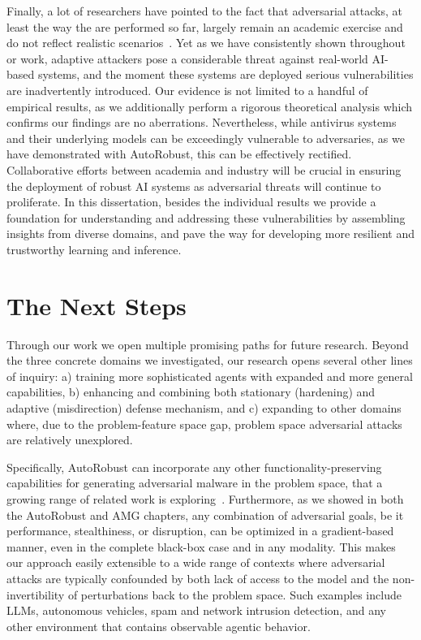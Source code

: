 Finally, a lot of researchers have pointed to the fact that adversarial attacks, at least the way the are performed so far, largely remain an academic exercise and do not reflect realistic scenarios~\cite{apruzzese2023real}.
Yet as we have consistently shown throughout or work, adaptive attackers pose a considerable threat against real-world AI-based systems, and the moment these systems are deployed serious vulnerabilities are inadvertently introduced.
Our evidence is not limited to a handful of empirical results, as we additionally perform a rigorous theoretical analysis which confirms our findings are no aberrations.
Nevertheless, while antivirus systems and their underlying models can be exceedingly vulnerable to adversaries, as we have demonstrated with AutoRobust, this can be effectively rectified.
Collaborative efforts between academia and industry will be crucial in ensuring the deployment of robust \gls{AI} systems as adversarial threats will continue to proliferate.
In this dissertation, besides the individual results we provide a foundation for understanding and addressing these vulnerabilities by assembling insights from diverse domains, and pave the way for developing more resilient and trustworthy learning and inference.

\section{The Next Steps}

Through our work we open multiple promising paths for future research.
Beyond the three concrete domains we investigated, our research opens several other lines of inquiry: a) training more sophisticated agents with expanded and more general capabilities, b) enhancing and combining both stationary (hardening) and adaptive (misdirection) defense mechanism, and c) expanding to other domains where, due to the problem-feature space gap, problem space adversarial attacks are relatively unexplored.

Specifically, AutoRobust can incorporate any other functionality-preserving capabilities for generating adversarial malware in the problem space, that a growing range of related work is exploring~\cite{demetrio2021functionality, demetrio2021adversarial, labaca2021realizable, labaca2021aimed}.
Furthermore, as we showed in both the AutoRobust and AMG chapters, any combination of adversarial goals, be it performance, stealthiness, or disruption, can be optimized in a gradient-based manner, even in the complete black-box case and in any modality.
This makes our approach easily extensible to a wide range of contexts where adversarial attacks are typically confounded by both lack of access to the model and the non-invertibility of perturbations back to the problem space.
Such examples include LLMs, autonomous vehicles, spam and network intrusion detection, and any other environment that contains observable agentic behavior.

